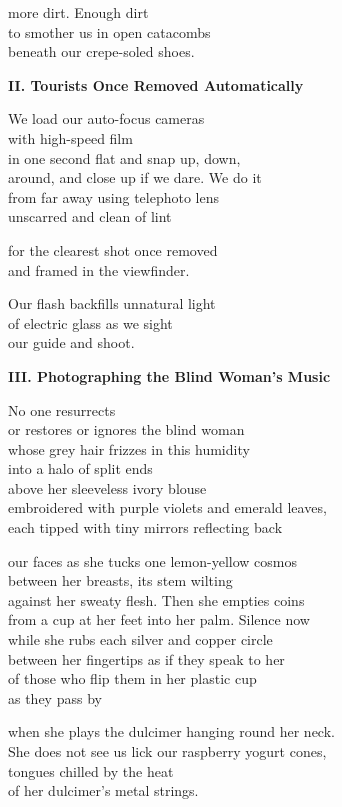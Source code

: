 \documentclass[twoside,10pt]{book}
\begin{document}
more dirt. Enough dirt\\
to smother us in open catacombs\\
beneath our crepe-soled shoes.

{\bf II.  Tourists Once Removed Automatically}

We load our auto-focus cameras\\
with high-speed film\\
in one second flat and snap up, down,\\
around, and close up if we dare. We do it\\
from far away using telephoto lens\\
unscarred and clean of lint

for the clearest shot once removed\\
and framed in the viewfinder.

Our flash backfills unnatural light\\
of electric glass as we sight\\
our guide and shoot.

{\bf III. Photographing the Blind Woman's Music}

No one resurrects\\
or restores or ignores the blind woman\\
whose grey hair frizzes in this humidity\\
into a halo of split ends\\
above her sleeveless ivory blouse\\
embroidered with purple violets and emerald leaves,\\
each tipped with tiny mirrors reflecting back

our faces as she tucks one lemon-yellow cosmos\\
between her breasts, its stem wilting\\
against her sweaty flesh. Then she empties coins\\
from a cup at her feet into her palm. Silence now\\
while she rubs each silver and copper circle\\
between her fingertips as if they speak to her\\
of those who flip them in her plastic cup\\
as they pass by

when she plays the dulcimer hanging round her neck.\\
She does not see us lick our raspberry yogurt cones,\\
tongues chilled by the heat\\
of her dulcimer's metal strings.
\end{document}
